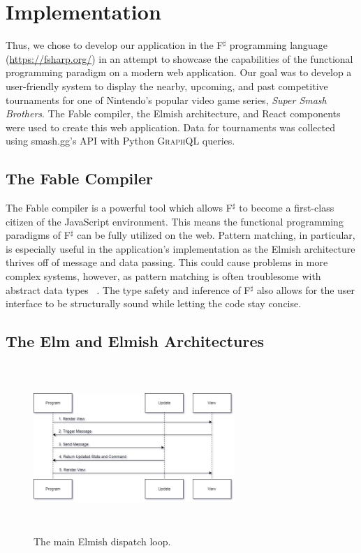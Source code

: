 \documentclass[sigconf]{acmart}
\begin{document}
\section{Implementation}

Thus, we chose to develop our application in the F$^{\sharp}$ programming language (\url{https://fsharp.org/}) in an attempt to showcase the capabilities of the functional programming paradigm on a modern web application. Our goal was to develop a user-friendly system to display the nearby, upcoming, and past competitive tournaments for one of Nintendo's popular video game series, \textit{Super Smash Brothers}. The Fable compiler, the Elmish architecture, and React components were used to create this web application. Data for tournaments was collected using smash.gg's \textsc{API} with Python \textsc{GraphQL} queries.

\subsection{The Fable Compiler}

The Fable compiler is a powerful tool which allows F$^{\sharp}$ to become a first-class citizen of the JavaScript environment. This means the functional programming paradigms of F$^{\sharp}$ can be fully utilized on the web. Pattern matching, in particular, is especially useful in the application's implementation as the Elmish architecture thrives off of message and data passing. This could cause problems in more complex systems, however, as pattern matching is often troublesome with abstract data types ~\cite{pattern}. The type safety and inference of F$^{\sharp}$ also allows for the user interface to be structurally sound while letting the code stay concise.

\subsection{The Elm and Elmish Architectures}

\begin{figure}
\includegraphics[height=2.5in, width=3in]{dispatchloop}
\caption{The main Elmish dispatch loop.}\label{dispatchloop}\end{figure}
\end{document}

